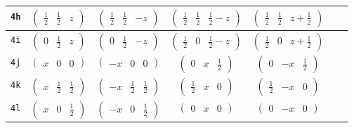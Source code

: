 \documentclass[fleqn,9pt,landscape]{jsarticle}
\begin{document}
\begin{center}
\begin{longtable}{ccccccc}
{\tt 4h} & $ \begin{pmatrix} \frac{1}{2} & \frac{1}{2} & z \end{pmatrix} $ & $ \begin{pmatrix} \frac{1}{2} & \frac{1}{2} & - z \end{pmatrix} $ & $ \begin{pmatrix} \frac{1}{2} & \frac{1}{2} & \frac{1}{2} - z \end{pmatrix} $ & $ \begin{pmatrix} \frac{1}{2} & \frac{1}{2} & z + \frac{1}{2} \end{pmatrix} $ & $  $ & $  $ \\ \hline
{\tt 4i} & $ \begin{pmatrix} 0 & \frac{1}{2} & z \end{pmatrix} $ & $ \begin{pmatrix} 0 & \frac{1}{2} & - z \end{pmatrix} $ & $ \begin{pmatrix} \frac{1}{2} & 0 & \frac{1}{2} - z \end{pmatrix} $ & $ \begin{pmatrix} \frac{1}{2} & 0 & z + \frac{1}{2} \end{pmatrix} $ & $  $ & $  $ \\ \hline
{\tt 4j} & $ \begin{pmatrix} x & 0 & 0 \end{pmatrix} $ & $ \begin{pmatrix} - x & 0 & 0 \end{pmatrix} $ & $ \begin{pmatrix} 0 & x & \frac{1}{2} \end{pmatrix} $ & $ \begin{pmatrix} 0 & - x & \frac{1}{2} \end{pmatrix} $ & $  $ & $  $ \\ \hline
{\tt 4k} & $ \begin{pmatrix} x & \frac{1}{2} & \frac{1}{2} \end{pmatrix} $ & $ \begin{pmatrix} - x & \frac{1}{2} & \frac{1}{2} \end{pmatrix} $ & $ \begin{pmatrix} \frac{1}{2} & x & 0 \end{pmatrix} $ & $ \begin{pmatrix} \frac{1}{2} & - x & 0 \end{pmatrix} $ & $  $ & $  $ \\ \hline
{\tt 4l} & $ \begin{pmatrix} x & 0 & \frac{1}{2} \end{pmatrix} $ & $ \begin{pmatrix} - x & 0 & \frac{1}{2} \end{pmatrix} $ & $ \begin{pmatrix} 0 & x & 0 \end{pmatrix} $ & $ \begin{pmatrix} 0 & - x & 0 \end{pmatrix} $ & $  $ & $  $ \\ \hline

\end{longtable}
\end{center}
\end{document}
